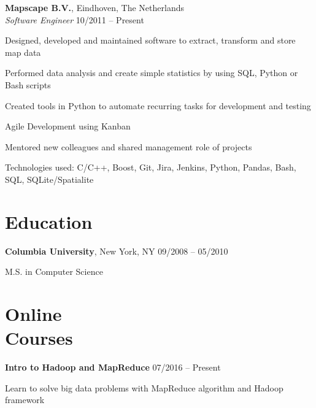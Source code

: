 \documentclass[margin,line]{resume}
\begin{document}
\begin{resume}
    \textbf{Mapscape B.V.}, Eindhoven, The Netherlands \\
    \textsl{Software Engineer} \hfill 10/2011 -- Present \vspace{-3mm}\\\vspace{-1mm}%
      \begin{list2}
      \item Designed, developed and maintained software to extract, transform and store map data
      \item Performed data analysis and create simple statistics by using SQL, Python or Bash scripts
      \item Created tools in Python to automate recurring tasks for development and testing
      \item Agile Development using Kanban
      \item Mentored new colleagues and shared management role of projects
      \item Technologies used: C/C++, Boost, Git, Jira, Jenkins, Python, Pandas, Bash, SQL, SQLite/Spatialite
      \end{list2}

    \section{\myheadingstyle Education}

    \textbf{Columbia University}, New York, NY \hfill 09/2008 -- 05/2010 \vspace{-3mm}\\\vspace{-1mm}%
      \begin{list2}
       \item M.S. in Computer Science
      \end{list2}
    \vspace{-1mm}
 
    \section{\myheadingstyle Online \\ Courses}

    \textbf{Intro to Hadoop and MapReduce} \hfill 07/2016 -- Present \vspace{-3mm}\\\vspace{-1mm}%
      \begin{list2}
       \item Learn to solve big data problems with MapReduce algorithm and Hadoop framework
      \end{list2}
    \vspace{-2mm}


\end{resume}
\end{document}
